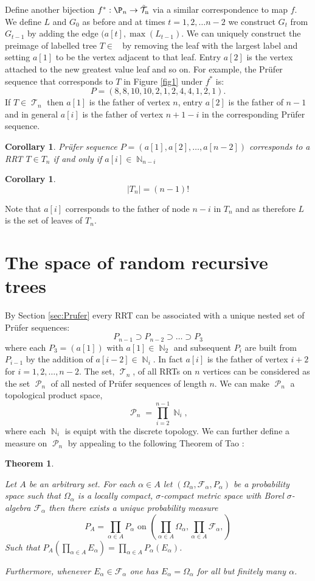 \documentclass[oneside]{book} %
\newtheorem{theorem}{Theorem}
\newtheorem{cor}[thm]{Corollary}
\theoremstyle{definition}
\numberwithin{equation}{section}
\DeclareMathOperator{\T}{\mathcal{T}}
\DeclareMathOperator{\lT}{\tilde{\mathcal{T}}_n}
\DeclareMathOperator{\N}{\mathbb{N}}
\DeclareMathOperator{\Pruf}{\mathcal{P}} %
\begin{document}
Define another bijection $f^{*}: \P_n \rightarrow \lT$ via a similar correspondence to map $f$.  We define $L$ and $G_0$ as before and at times $t=1,2,\dots n-2$ we construct $G_t$ from $G_{t-1}$ by adding the edge $(a[t],\max(L_{t-1})$.  We can uniquely construct the preimage of labelled tree $T \in \lT$ by removing the leaf with the largest label and setting $a[1]$ to be the vertex adjacent to that leaf. Entry $a[2]$ is the vertex attached to the new greatest value leaf and so on.  For example, the Pr\"{u}fer sequence that corresponds to $T$ in Figure \ref{fig1} under $f^*$ is:
\[P = (8,8,10,10,2,1,2,4,4,1,2,1).\]
If $T\in \T_n$ then $a[1]$ is the father of vertex $n$, entry $a[2]$ is the father of $n-1$ and in general $a[i]$ is the father of vertex $n + 1-i$ in the corresponding Pr\"{u}fer sequence.
\begin{cor}
 Pr\"{u}fer sequence $P = (a[1],a[2],\dots,a[n-2])$ corresponds to a RRT $T \in T_n$ if and only if $a[i] \in \N_{n-i}$ 
\end{cor}

\begin{cor}
\[
 \lvert T_n \rvert  = (n-1)!
\]
\end{cor}
Note that $a[i]$ corresponds to the father of node $n-i$ in $T_n$ and as therefore $L$ is the set of leaves of $T_n$.  

\section{The space of random recursive trees}
By Section \ref{sec:Prufer} every RRT can be associated with a unique nested set of Pr\"{u}fer sequences:
\[P_{n-1} \supset P_{n-2} \supset \dots \supset P_3\]
where each $P_3 = (a[1])$ with $a[1] \in \N_2$ and subsequent $P_i$ are built from $P_{i-1}$ by the addition of $a[i-2] \in \N_{i}$.  In fact $a[i]$ is the father of vertex $i+2$ for $i = 1,2,\dots, n-2$.  The set, $\T_n$, of all RRTs on $n$ vertices can be considered as the set $\Pruf_n$ of all nested  of Pr\"{u}fer sequences of length $n$.  We can make $\Pruf_n$ a topological product space,
\[
 \Pruf_n = \prod_{i=2}^{n-1} \N_i,
\]
where each $\N_i$ is equipt with the discrete topology.  We can further define a measure on $\Pruf_n$ by appealing to the following Theorem of Tao \cite{Tao}:
\begin{theorem}\label{thm:tao}

 Let $A$ be an arbitrary set.  For each $\alpha \in A$ let $(\Omega_{\alpha},\mathcal{F}_\alpha,P_\alpha)$ be a probability space such that $\Omega_{\alpha}$ is a locally compact, $\sigma$-compact metric space with Borel $\sigma$-algebra $\mathcal{F}_{\alpha}$ then there exists a unique probability measure
 \[
  P_{A} = \prod_{\alpha \in A}P_\alpha \text{   on   } \left(\prod_{\alpha \in A}\Omega_\alpha, \prod_{\alpha \in A}\mathcal{F}_\alpha,\right)  
 \]
 Such that $P_A\left(\prod_{\alpha \in A}E_\alpha\right)  = \prod_{\alpha \in A} P_\alpha(E_\alpha)$.  
 
 Furthermore, whenever $E_\alpha \in \mathcal{F}_\alpha$ one has $E_\alpha = \Omega_{\alpha}$ for all but finitely many $\alpha$. 
\end{theorem}
\end{document}
